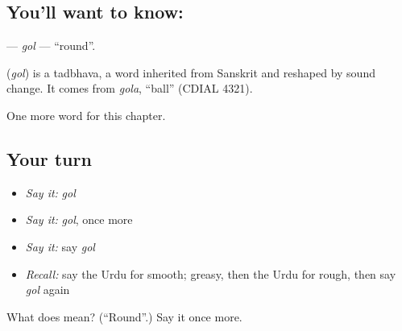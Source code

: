 \subsection*{You'll want to know: }
\textbf{} — \emph{gol} — \textquotedblleft{}round\textquotedblright{}.

\begin{cousinweb}
\textbf{} (\emph{gol}) is a tadbhava, a word inherited from Sanskrit and reshaped by sound change. It comes from \emph{gola}, \textquotedblleft{}ball\textquotedblright{} (CDIAL 4321).
\end{cousinweb}

\begin{grammarlens}[title={What you've built}]
One more word for this chapter.
\end{grammarlens}

\subsection*{Your turn}
\begin{itemize}
\raggedright
  \item \emph{Say it:} \emph{gol}
  \item \emph{Say it:} \emph{gol}, once more
  \item \emph{Say it:} say \emph{gol}
  \item \emph{Recall:} say the Urdu for smooth; greasy, then the Urdu for rough, then say \emph{gol} again
\end{itemize}

\begin{tcolorbox}[breakable,colback=teal!4,colframe=teal!35!black,title={Before you move on}]
What does  mean? (\textquotedblleft{}Round\textquotedblright{}.) Say it once more.
\end{tcolorbox}
